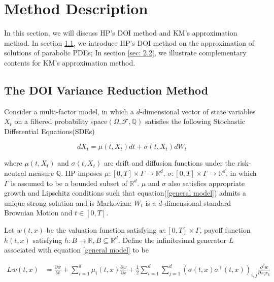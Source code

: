 \chapter{Method Description}\label{ch2}

In this section, we will discuss HP's DOI method and KM's approximation method. In section \ref{sec: 2.1}, we introduce HP's DOI method on the approximation of solutions of parabolic PDEs; In section \ref{sec: 2.2}, we illustrate complementary contents for KM's approximation method.

\section{The DOI Variance Reduction Method}
\label{sec: 2.1}

Consider a multi-factor model, in which a $d$-dimensional vector of state variables $X_t$ on a filtered probability space$(\Omega,\mathcal F, \mathbb Q)$ satisfies the following Stochastic Differential Equations(SDEs)

\begin{equation}\label{general model}
    dX_t= \mu(t, X_t) dt + \sigma(t, X_t) dW_t
\end{equation}

\noindent where $\mu(t,X_t)$ and $\sigma(t, X_t)$ are drift and diffusion functions under the risk-neutral measure $\mathbb Q$. HP imposes $\mu: [0,T] \times \Gamma \rightarrow \mathbb R^d$, $\sigma: [0,T] \times \Gamma \rightarrow \mathbb R^d$, in which $\Gamma$ is assumed to be a bounded subset of $\mathbb R^d$. $\mu$ and $\sigma$ also satisfies appropriate growth and Lipschitz conditions such that equation(\ref{general model}) admits a unique strong solution and is Markovian; $W_t$ is a $d$-dimensional standard Brownian Motion and $t \in [0,T]$.

Let $w(t,x)$ be the valuation function satisfying $w: [0,T] \times \Gamma$, payoff function $h(t,x)$ satisfying $h: B \rightarrow \mathbb R, B \subseteq \mathbb R^d$. Define the infinitesimal generator $L$ associated with equation \eqref{general model} to be

\begin{equation}\label{general inf gen}
    \begin{aligned}
        L w(t, x)&=\frac{\partial w}{\partial t} + \sum_{i=1}^{d} \mu_i(t, x) \frac{\partial w}{\partial x}+\frac{1}{2} \sum_{i=1}^{d}\sum_{j=1}^{d} (\sigma(t,x) \sigma^{\intercal}(t,x))_{i,j} \frac{\partial^2 w}{\partial x_i x_k}
    \end{aligned}
\end{equation}

